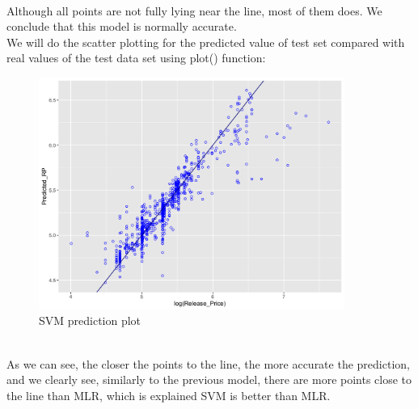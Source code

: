 \documentclass[a4paper]{article}
\theoremstyle{definition}
\begin{document}
\\
Although all points are not fully lying near the line, most of them does. We conclude that this model is normally accurate.\\
We will do the scatter plotting for the predicted value of test set compared with real values of the test data set using plot() function:\\
\begin{figure}[h!]
\begin{center}
\includegraphics[width=10cm]{images/svm.png}
\end{center}
\caption{SVM prediction plot}
\end{figure}
\pagebreak
\\
As we can see, the closer the points to the line, the more accurate the prediction, and we clearly see, similarly to the previous model, there are more points close to the line than MLR, which is explained SVM is better than MLR.
\end{document}

